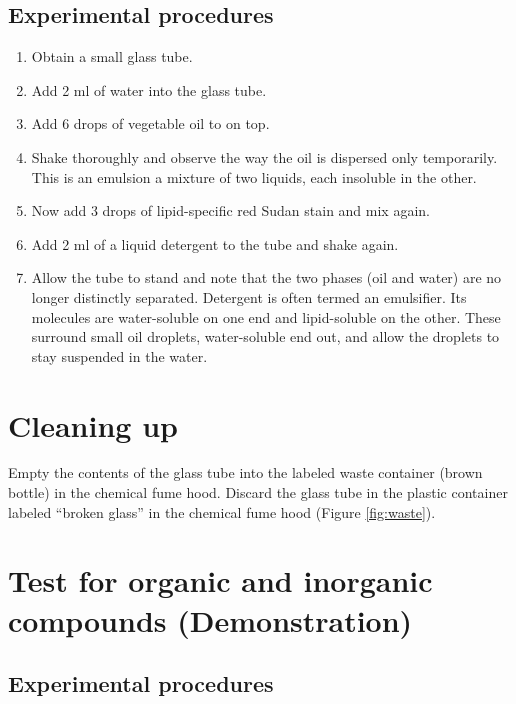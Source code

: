 \documentclass[]{book}
\providecommand{\tightlist}{%
  \setlength{\itemsep}{0pt}\setlength{\parskip}{0pt}}
\begin{document}
\hypertarget{experimental-procedures-4}{%
\subsection{Experimental procedures}\label{experimental-procedures-4}}

\begin{enumerate}
\def\labelenumi{\arabic{enumi}.}
\tightlist
\item
  Obtain a small glass tube.
\item
  Add 2 ml of water into the glass tube.
\item
  Add 6 drops of vegetable oil to on top.
\item
  Shake thoroughly and observe the way the oil is dispersed only temporarily. This is an emulsion a mixture of two liquids, each insoluble in the other.
\item
  Now add 3 drops of lipid-specific red Sudan stain and mix again.
\item
  Add 2 ml of a liquid detergent to the tube and shake again.
\item
  Allow the tube to stand and note that the two phases (oil and water) are no longer distinctly separated. Detergent is often termed an emulsifier. Its molecules are water-soluble on one end and lipid-soluble on the other. These surround small oil droplets, water-soluble end out, and allow the droplets to stay suspended in the water.
\end{enumerate}

\hypertarget{cleaning-up-1}{%
\section{Cleaning up}\label{cleaning-up-1}}

Empty the contents of the glass tube into the labeled waste container (brown bottle) in the chemical fume hood. Discard the glass tube in the plastic container labeled ``broken glass'' in the chemical fume hood (Figure \ref{fig:waste}).

\hypertarget{test-for-organic-and-inorganic-compounds-demonstration}{%
\section{Test for organic and inorganic compounds (Demonstration)}\label{test-for-organic-and-inorganic-compounds-demonstration}}

\hypertarget{experimental-procedures-5}{%
\subsection{Experimental procedures}\label{experimental-procedures-5}}
\end{document}
